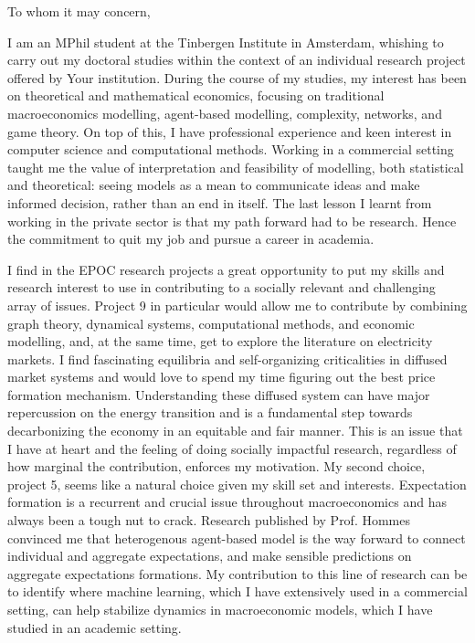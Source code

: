 \documentclass{letter}
\begin{document}
\begin{letter}{}

    \opening{To whom it may concern,}

    I am an MPhil student at the Tinbergen Institute in Amsterdam, whishing to carry out my doctoral studies within the context of an individual research project offered by Your institution. During the course of my studies, my interest has been on theoretical and mathematical economics, focusing on traditional macroeconomics modelling, agent-based modelling, complexity, networks, and game theory. On top of this, I have professional experience and keen interest in computer science and computational methods. Working in a commercial setting taught me the value of interpretation and feasibility of modelling, both statistical and theoretical: seeing models as a mean to communicate ideas and make informed decision, rather than an end in itself. The last lesson I learnt from working in the private sector is that my path forward had to be research. Hence the commitment to quit my job and pursue a career in academia.

    I find in the EPOC research projects a great opportunity to put my skills and research interest to use in contributing to a socially relevant and challenging array of issues. Project 9 in particular would allow me to contribute by combining graph theory, dynamical systems, computational methods, and economic modelling, and, at the same time, get to explore the literature on electricity markets. I find fascinating equilibria and self-organizing criticalities in diffused market systems and would love to spend my time figuring out the best price formation mechanism. Understanding these diffused system can have major repercussion on the energy transition and is a fundamental step towards decarbonizing the economy in an equitable and fair manner. This is an issue that I have at heart and the feeling of doing socially impactful research, regardless of how marginal the contribution, enforces my motivation. My second choice, project 5, seems like a natural choice given my skill set and interests. Expectation formation is a recurrent and crucial issue throughout macroeconomics and has always been a tough nut to crack. Research published by Prof. Hommes convinced me that heterogenous agent-based model is the way forward to connect individual and aggregate expectations, and make sensible predictions on aggregate expectations formations. My contribution to this line of research can be to identify where machine learning, which I have extensively used in a commercial setting, can help stabilize dynamics in macroeconomic models, which I have studied in an academic setting.


\end{letter}
\end{document}

